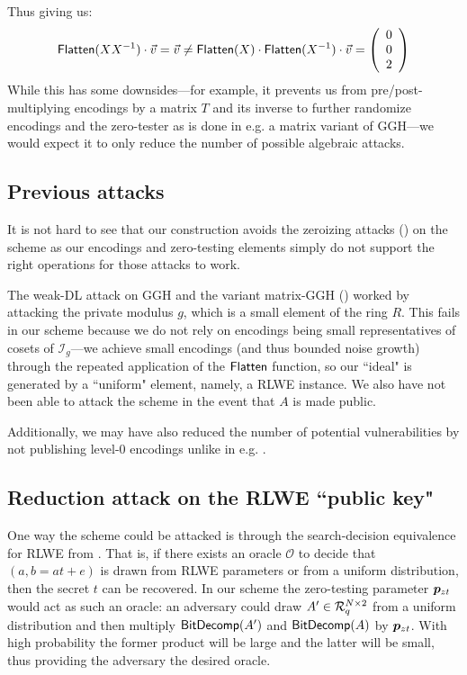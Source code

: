 Thus giving us: $$\mathsf{Flatten}(XX^{-1})\cdot\vec{v} = \vec{v} \not= \mathsf{Flatten}(X)\cdot\mathsf{Flatten}(X^{-1})\cdot\vec{v} = \left(\begin{array}{c}0 \\ 0 \\ 2 \end{array}\right)$$  While this has some downsides---for example, it prevents us from pre/post-multiplying encodings by a matrix $T$ and its inverse to further randomize encodings and the zero-tester as is done in e.g. a matrix variant of GGH---we would expect it to only reduce the number of possible algebraic attacks.

\subsection{Previous attacks}
It is not hard to see that our construction avoids the zeroizing attacks (\cite{chl}) on the \cite{clt} scheme as our encodings and zero-testing elements simply do not support the right operations for those attacks to work.

The weak-DL attack on GGH and the variant matrix-GGH (\cite{cgh, hj}) worked by attacking the private modulus $g$, which is a small element of the ring $R$.  This fails in our scheme because we do not rely on encodings being small representatives of cosets of $\mathcal{I}_g$---we achieve small encodings (and thus bounded noise growth) through the repeated application of the $\mathsf{Flatten}$ function, so our ``ideal" is generated by a ``uniform" element, namely, a RLWE instance.  We also have not been able to attack the scheme in the event that $A$ is made public.

Additionally, we may have also reduced the number of potential vulnerabilities by not publishing level-$0$ encodings unlike in e.g. \cite{clt}.

\subsection{Reduction attack on the RLWE ``public key"}

One way the scheme could be attacked is through the search-decision equivalence for RLWE from \cite{lpr}.  That is, if there exists an oracle $\mathcal{O}$ to decide that $(a, b = at+e)$ is drawn from RLWE parameters or from a uniform distribution, then the secret $t$ can be recovered.  In our scheme the zero-testing parameter $\bm{p}_{zt}$ would act as such an oracle: an adversary could draw $A' \in \mathcal{R}_q^{N \times 2}$ from a uniform distribution and then multiply $\mathsf{BitDecomp}(A')$ and $\mathsf{BitDecomp}(A)$ by $\bm{p}_{zt}$.  With high probability the former product will be large and the latter will be small, thus providing the adversary the desired oracle.

